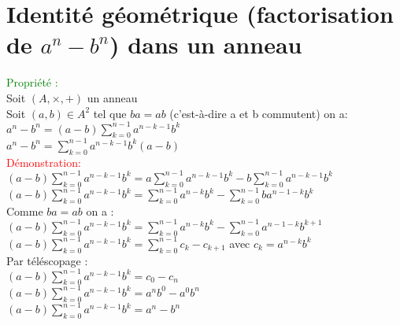 \documentclass{article}
\begin{document}
\section{Identité géométrique (factorisation de $a^n-b^n$) dans un anneau}
\textcolor{green}{Propriété :} \\ 
Soit $(A, \times,+)$ un anneau \\ 
Soit $(a,b)\in A^2$ tel que $ba=ab$ (c'est-à-dire a et b commutent) on a: \\
$a^n-b^n=(a-b)\sum^{n-1}_{k=0}{a^{n-k-1}b^k}$\\
$a^n-b^n=\sum^{n-1}_{k=0}{a^{n-k-1}b^k}(a-b)$ \\ 
\textcolor{red}{Démonstration:} \\
$(a-b)\sum^{n-1}_{k=0}{a^{n-k-1}b^k}= a\sum^{n-1}_{k=0}{a^{n-k-1}b^k}-b\sum^{n-1}_{k=0}{a^{n-k-1}b^k}$ \\
$(a-b)\sum^{n-1}_{k=0}{a^{n-k-1}b^k}=\sum^{n-1}_{k=0}{a^{n-k}b^k} -\sum^{n-1}_{k=0}b{a^{n-1-k}b^k}$\\
Comme $ba=ab$ on a : \\
$(a-b)\sum^{n-1}_{k=0}{a^{n-k-1}b^k}=\sum^{n-1}_{k=0}{a^{n-k}b^k} -\sum^{n-1}_{k=0}{a^{n-1-k}b^{k+1}}$ \\ 
$(a-b)\sum^{n-1}_{k=0}{a^{n-k-1}b^k}=\sum^{n-1}_{k=0}{c_k-c_{k+1}}$ avec $c_k=a^{n-k}b^{k}$ \\ 
Par téléscopage : \\ 
$(a-b)\sum^{n-1}_{k=0}{a^{n-k-1}b^k}=c_0-c_n$ \\ 
$(a-b)\sum^{n-1}_{k=0}{a^{n-k-1}b^k}=a^nb^0-a^0b^n$ \\
$(a-b)\sum^{n-1}_{k=0}{a^{n-k-1}b^k}=a^n-b^n$
\end{document}
